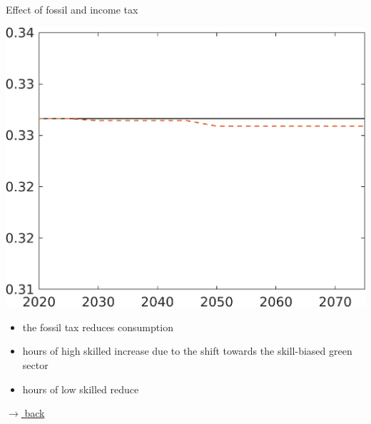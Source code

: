 \documentclass[11pt,aspectratio=169]{beamer}
\begin{document}
\begin{frame}{Effect of fossil and income tax}
\begin{minipage}[]{0.3\textwidth}
	\end{minipage}
	\begin{minipage}[]{0.3\textwidth}
		\includegraphics[width=1\textwidth]{../codding_model/own_basedOnFried/optimalPol_elastS_DisuSci/figures/all_1705/CompCounterFac_withLF_noopt_taufopt1_taulopt0_hl_spillover0_noskill0_sep1_BN0_ineq0_red0_xgrowth0_etaa0.79_lgd0.png}
	\end{minipage}
	
	\vspace{3mm}
	\begin{itemize}
		\item the fossil tax reduces consumption
		\item hours of high skilled increase due to the shift towards the skill-biased green sector
		\item hours of low skilled reduce
	\end{itemize}

\vspace{-3mm}
\hfill
\hyperlink{effalloback}{\tiny{$\rightarrow$ back}} 
\end{frame}
\end{document}
